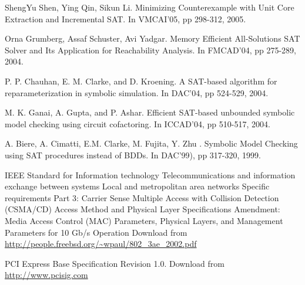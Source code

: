 \documentclass[journal]{IEEEtran}
\begin{document}
\begin{thebibliography}{1}
ShengYu Shen, Ying Qin, Sikun Li.
Minimizing Counterexample with Unit Core Extraction and Incremental SAT.
In VMCAI'05,
pp 298-312,
2005.

Orna Grumberg, Assaf Schuster, Avi Yadgar.
Memory Efficient All-Solutions SAT Solver and Its Application for Reachability Analysis.
In FMCAD'04,
pp 275-289,
2004.

P. P. Chauhan, E. M. Clarke, and D. Kroening.
A SAT-based algorithm for reparameterization in symbolic simulation.
In DAC'04,
pp 524-529,
2004.

M. K. Ganai, A. Gupta, and P. Ashar.
Efficient SAT-based unbounded symbolic model checking using circuit cofactoring.
In ICCAD'04,
pp 510-517,
2004.

A. Biere, A. Cimatti, E.M. Clarke, M. Fujita, Y. Zhu .
Symbolic Model Checking using SAT procedures instead of BDDs.
In DAC'99),
pp 317-320,
1999.

IEEE Standard for Information technology
Telecommunications and information exchange between systems
Local and metropolitan area networks
Specific requirements
Part 3: Carrier Sense Multiple Access with
Collision Detection (CSMA/CD) Access Method
and Physical Layer Specifications
Amendment: Media Access Control (MAC)
Parameters, Physical Layers, and Management
Parameters for 10 Gb/s Operation
Download from \url{http://people.freebsd.org/~wpaul/802_3ae_2002.pdf}

PCI Express Base Specification Revision 1.0.
Download from \url{http://www.pcisig.com}



\end{thebibliography}
\end{document}
